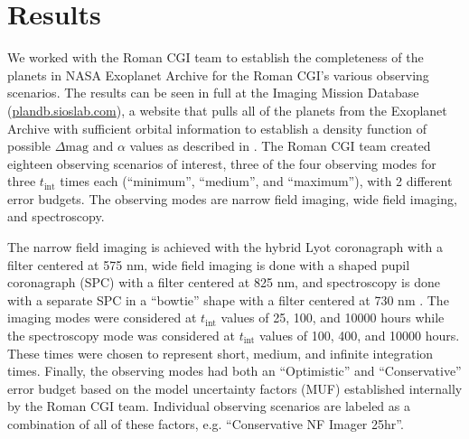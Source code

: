 \section{Results}%
\label{sec:coupling_results}

We worked with the Roman CGI team to establish the completeness of the planets
in NASA Exoplanet Archive \citep{akesonNASAExoplanet2013} for the Roman CGI's
various observing scenarios. The results can be seen in full at the Imaging Mission Database
(\url{plandb.sioslab.com}), a website that pulls all of the planets from the
Exoplanet Archive with sufficient orbital information to establish a density
function of possible $\Delta\textrm{mag}$ and $\alpha$ values as described in
\citet{savranskyExplorationDynamical2019}. The Roman CGI team created eighteen
observing scenarios of interest, three of the four observing modes for three
$t_\textrm{int}$ times each (``minimum'', ``medium'', and ``maximum''), with 2
different error budgets. The observing modes are narrow field imaging, wide
field imaging, and spectroscopy.

The narrow field imaging is achieved with the hybrid Lyot coronagraph with a
filter centered at 575 nm, wide field imaging is done with a shaped pupil
coronagraph (SPC) with a filter centered at 825 nm, and spectroscopy is done
with a separate SPC in a ``bowtie'' shape with a filter centered at 730 nm
\citep{kasdinNancyGrace2020}. 
The imaging modes were considered at $t_\textrm{int}$ values of 25, 100, and
10000 hours while the spectroscopy mode was considered at $t_\textrm{int}$
values of 100, 400, and 10000 hours. These times were chosen to represent
short, medium, and infinite integration times. Finally, the observing modes had
both an ``Optimistic'' and ``Conservative'' error budget based on the model
uncertainty factors (MUF) established internally by the Roman CGI team. 
Individual observing scenarios are labeled as a combination of all of these
factors, e.g. ``Conservative NF Imager 25hr''.


